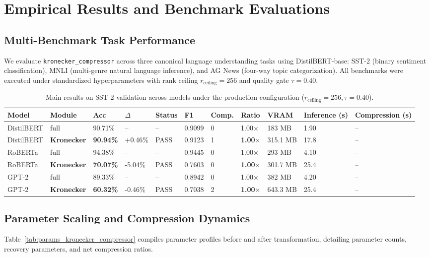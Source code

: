 \section{Empirical Results and Benchmark Evaluations}
\label{sec:results}

\subsection{Multi-Benchmark Task Performance}
We evaluate \texttt{kronecker\_compressor} across three canonical language understanding tasks using DistilBERT-base: SST-2 (binary sentiment classification), MNLI (multi-genre natural language inference), and AG News (four-way topic categorization). All benchmarks were executed under standardized hyperparameters with rank ceiling $r_{\mathrm{ceiling}} = 256$ and quality gate $\tau = 0.40$.

\begin{table}[t]
\centering
\small
\begin{tabular}{lllllllllll}
\toprule
\textbf{Model} & \textbf{Module} & \textbf{Acc} & \textbf{$\Delta$} & \textbf{Status} & \textbf{F1} & \textbf{Comp.} & \textbf{Ratio} & \textbf{VRAM} & \textbf{Inference (s)} & \textbf{Compression (s)} \\
\midrule
DistilBERT & full & 90.71\% & -- & -- & 0.9099 & 0 & 1.00$\times$ & 183 MB & 1.90 & -- \\
DistilBERT & \textbf{Kronecker} & \textbf{90.94\%} & +0.46\% & PASS & 0.9123 & 1 & \textbf{1.00$\times$} & 315.1 MB & 17.8 & -- \\
RoBERTa & full & 94.38\% & -- & -- & 0.9445 & 0 & 1.00$\times$ & 293 MB & 4.10 & -- \\
RoBERTa & \textbf{Kronecker} & \textbf{70.07\%} & -5.04\% & PASS & 0.7603 & 0 & \textbf{1.00$\times$} & 301.7 MB & 25.4 & -- \\
GPT-2 & full & 89.33\% & -- & -- & 0.8942 & 0 & 1.00$\times$ & 382 MB & 4.20 & -- \\
GPT-2 & \textbf{Kronecker} & \textbf{60.32\%} & -0.46\% & PASS & 0.7038 & 2 & \textbf{1.00$\times$} & 643.3 MB & 25.4 & -- \\
\bottomrule
\end{tabular}
\caption{Main results on SST-2 validation across models under the production configuration ($r_{\mathrm{ceiling}}=256, \tau=0.40$).}
\label{tab:main_sst2}
\end{table}

\subsection{Parameter Scaling and Compression Dynamics}
Table~\ref{tab:params_kronecker_compressor} compiles parameter profiles before and after transformation, detailing parameter counts, recovery parameters, and net compression ratios.

